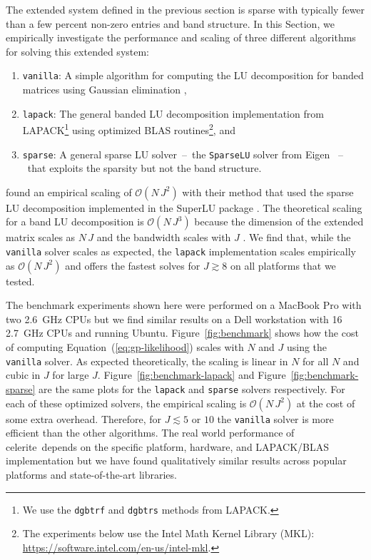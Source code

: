 \documentclass[manuscript, letterpaper]{aastex6}
\newcommand{\project}[1]{\textsf{#1}}
\newcommand{\celerite}{\project{celerite}}
\newcommand{\figureref}[1]{\ref{fig:#1}}
\newcommand{\Figure}[1]{Figure~\figureref{#1}}
\renewcommand{\eqref}[1]{\ref{eq:#1}}
\newcommand{\Eq}[1]{Equation~(\eqref{#1})}
\newcommand{\eq}[1]{\Eq{#1}}
\newcommand{\sectionname}{Section}
\begin{document}
The extended system defined in the previous section is sparse with typically fewer than
a few percent non-zero entries and band structure.
In this \sectionname, we empirically investigate the performance and scaling
of three different algorithms for solving this extended system:

\begin{enumerate}

\item \texttt{vanilla}: A simple algorithm for computing the LU decomposition
    for banded matrices using Gaussian elimination \citep{Press:1992,
    Press:2007},

\item \texttt{lapack}: The general banded LU decomposition implementation from
    LAPACK\footnote{We use the \texttt{dgbtrf} and \texttt{dgbtrs} methods
    from LAPACK.} \citep{Anderson:1999} using optimized BLAS
    routines\footnote{The experiments below use the Intel Math Kernel Library
    (\project{MKL}): \url{https://software.intel.com/en-us/intel-mkl}.}, and

\item \texttt{sparse}: A general sparse LU solver~--~the \texttt{SparseLU}
    solver from \project{Eigen} \citep{Guennebaud:2010}~--~that exploits the
    sparsity but not the band structure.

\end{enumerate}

\citet{Ambikasaran:2015} found an empirical scaling of $\mathcal{O}(N\,J^2)$
with their method that used the sparse LU decomposition implemented in the
\project{SuperLU} package \citep{Demmel:1999}.
The theoretical scaling for a band LU decomposition is $\mathcal{O}(N\,J^3)$
because the dimension of the extended matrix scales as $N\,J$ and the
bandwidth scales with $J$ \citep{Press:1992, Press:2007}.
We find that, while the \texttt{vanilla} solver scales as expected, the
\texttt{lapack} implementation scales empirically as $\mathcal{O}(N\,J^2)$ and
offers the fastest solves for $J \gtrsim 8$ on all platforms that we tested.

The benchmark experiments shown here were performed on a MacBook Pro with two
2.6~GHz CPUs but we find similar results on a Dell workstation with 16 2.7~GHz
CPUs and running Ubuntu.
\Figure{benchmark} shows how the cost of computing \eq{gp-likelihood} scales
with $N$ and $J$ using the \texttt{vanilla} solver.
As expected theoretically, the scaling is linear in $N$ for all $N$ and cubic
in $J$ for large $J$.
\Figure{benchmark-lapack} and \Figure{benchmark-sparse} are the same plots for
the \texttt{lapack} and \texttt{sparse} solvers respectively.
For each of these optimized solvers, the empirical scaling is
$\mathcal{O}(N\,J^2)$ at the cost of some extra overhead.
Therefore, for $J \lesssim 5$ or $10$ the \texttt{vanilla} solver is more
efficient than the other algorithms.
The real world performance of \celerite\ depends on the specific platform,
hardware, and \project{LAPACK}/\project{BLAS} implementation but we have found
qualitatively similar results across popular platforms and state-of-the-art
libraries.
\end{document}
